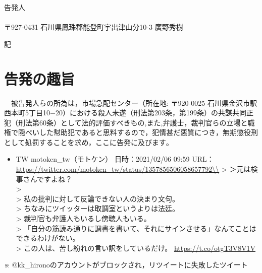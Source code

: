 \documentclass[
]{ltjarticle}
\providecommand{\tightlist}{%
  \setlength{\itemsep}{0pt}\setlength{\parskip}{0pt}}
\begin{document}
\hspace{90mm}

\fontsize{11pt}{11pt}\selectfont
告発人\\
\\
〒927-0431 石川県鳳珠郡能登町宇出津山分10-3 \hspace{60mm}廣野秀樹

\vspace{6mm}
\begin{center}
記
\par\end{center}
\vspace{1mm}

\section{告発の趣旨}
　被告発人らの所為は，市場急配センター（所在地: 〒920-0025 石川県金沢市駅西本町5丁目10−20）における殺人未遂（刑法第203条，第199条）の共謀共同正犯（刑法第60条）として法的評価すべきもの,また,弁護士，裁判官らの立場と職権で隠ぺいした幇助犯であると思料するので，犯情甚だ悪質につき，無期懲役刑として処罰することを求め，ここに告発に及びます｡
\clearpage

{
\setcounter{tocdepth}{4}
\tableofcontents
}
\begin{itemize}
\tightlist
\item
  TW motoken\_tw（モトケン） 日時：2021/02/06 09:59 URL：
  \url{https://twitter.com/motoken\_tw/status/1357856506058657792\\} 
  \textgreater{} ＞元は検事さんですよね？\\
  \textgreater{}\\
  \textgreater{} 私の批判に対して反論できない人の決まり文句。\\
  \textgreater{} ちなみにツイッターは取調室というよりは法廷。\\
  \textgreater{} 裁判官も弁護人もいるし傍聴人もいる。\\
  \textgreater{}
  「自分の筋読み通りに調書を書いて、それにサインさせる」なんてことはできるわけがない。\\
  \textgreater{} この人は、苦し紛れの言い訳をしているだけ。
  \url{https://t.co/otgT3V8V1V} 
\end{itemize}

※ @kk\_hironoのアカウントがブロックされ，リツイートに失敗したツイート
\end{document}
